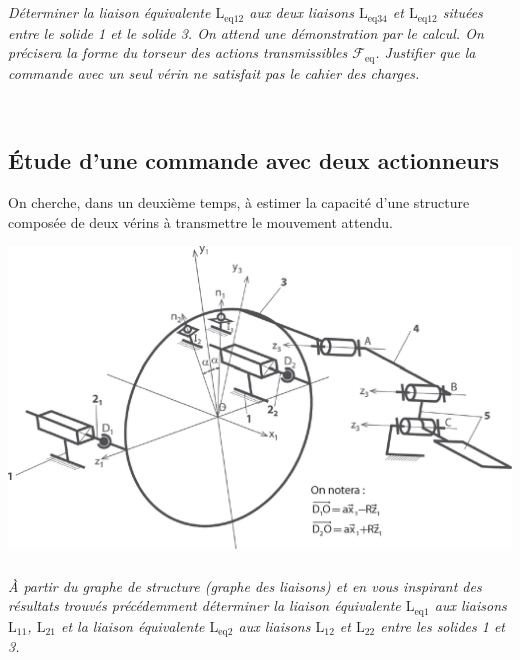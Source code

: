 \documentclass[10pt,fleqn]{article} %
\begin{document}
\begin{multicols}{2}
\subparagraph{}\textit{Déterminer la liaison équivalente $\text{L}_{\text{eq}12}$ aux deux liaisons $\text{L}_{\text{eq}34}$ et $\text{L}_{\text{eq}12}$ situées entre le solide 1 et le solide 3. On attend une démonstration par le calcul. On précisera la forme du torseur des actions transmissibles $\mathcal{F}_{\text{eq}}$.
Justifier que la commande avec un seul vérin ne satisfait pas le cahier des charges.}
\ifprof
\begin{corrige}~\\
\end{corrige}
\else
\fi

\subsection*{Étude d'une commande avec deux actionneurs}
\begin{obj}
On cherche, dans un deuxième temps, à estimer la capacité d'une structure composée de deux
vérins à transmettre le mouvement attendu.
\end{obj}


\begin{center}
\includegraphics[width=\linewidth]{images/fig_05}
\end{center}

\subparagraph{}\textit{À partir du graphe de structure (graphe des liaisons) et en vous inspirant des résultats trouvés précédemment déterminer la liaison équivalente $\text{L}_{\text{eq}1}$
aux liaisons $\text{L}_{11}$, $\text{L}_{21}$ et la liaison équivalente $\text{L}_{\text{eq}2}$ aux liaisons $\text{L}_{12}$ et $\text{L}_{22}$ entre les solides 1 et 3.}
\ifprof
\begin{corrige}~\\
\end{corrige}
\else
\fi



\end{multicols}
\end{document}

